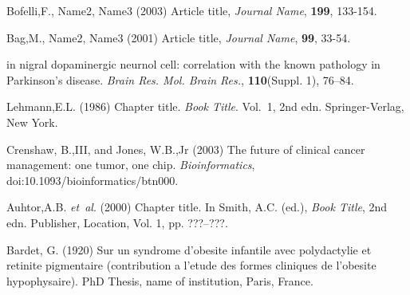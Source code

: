 \documentclass{bioinfo}
\begin{document}
\begin{thebibliography}{}
 Bofelli,F., Name2, Name3 (2003) Article title, {\it Journal Name}, {\bf 199}, 133-154.

 Bag,M., Name2, Name3 (2001) Article title, {\it Journal Name}, {\bf 99}, 33-54.

in nigral dopaminergic neurnol cell: correlation with the known
pathology in Parkinson's disease. \textit{Brain Res. Mol. Brain
Res.}, \textbf{110}(Suppl. 1), 76--84.

Lehmann,E.L. (1986) Chapter title. \textit{Book Title}. Vol.~1, 2nd edn. Springer-Verlag, New York.

Crenshaw, B.,III, and Jones, W.B.,Jr (2003) The future of clinical
cancer management: one tumor, one chip. \textit{Bioinformatics},
doi:10.1093/bioinformatics/btn000.

Auhtor,A.B. \textit{et~al}. (2000) Chapter title. In Smith, A.C.
(ed.), \textit{Book Title}, 2nd edn. Publisher, Location, Vol. 1, pp.
???--???.

Bardet, G. (1920) Sur un syndrome d'obesite infantile avec
polydactylie et retinite pigmentaire (contribution a l'etude des
formes cliniques de l'obesite hypophysaire). PhD Thesis, name of
institution, Paris, France.

\end{thebibliography}
\end{document}
